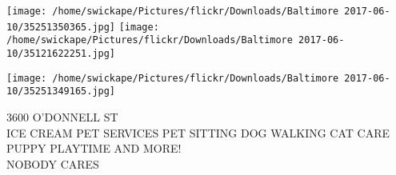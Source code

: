 \documentclass[10pt,letterpaper]{article}
\begin{document}
\texttt{[image: /home/swickape/Pictures/flickr/Downloads/Baltimore 2017-06-10/35251350365.jpg]}
\texttt{[image: /home/swickape/Pictures/flickr/Downloads/Baltimore 2017-06-10/35121622251.jpg]}

\texttt{[image: /home/swickape/Pictures/flickr/Downloads/Baltimore 2017-06-10/35251349165.jpg]}

3600 O'DONNELL ST\\
ICE CREAM PET SERVICES PET SITTING DOG WALKING CAT CARE PUPPY PLAYTIME AND MORE!\\
NOBODY CARES\\
\pagebreak
\end{document}
